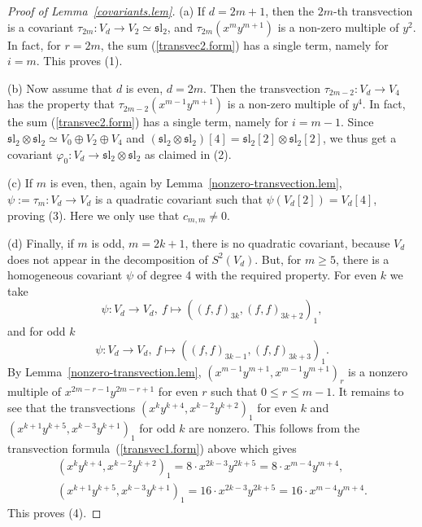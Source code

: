 \documentclass{amsart}
\theoremstyle{definition}
\theoremstyle{remark}
\begin{document}
\begin{proof}[Proof of Lemma~\ref{covariants.lem}]
(a) If $d = 2m+1$, then the $2m$-th transvection is a covariant $\tau_{2m}\colon V_{d} \to V_{2}\simeq \operatorname{{\mathfrak sl}_{2}}$, and  $\tau_{2m}(x^{m}y^{m+1})$ is a non-zero multiple of $y^{2}$. In fact, for $r=2m$, the sum (\ref{transvec2.form}) has a single term, namely for $i=m$. This proves (1).
\par\smallskip
(b) Now assume that $d$ is even, $d = 2m$. Then the transvection $\tau_{2m-2}\colon V_{d} \to V_{4}$ has the property that $\tau_{2m-2}(x^{m-1}y^{m+1})$ is a non-zero multiple of $y^{4}$. In fact, the sum (\ref{transvec2.form}) has a single term, namely for $i=m-1$. Since  $\operatorname{{\mathfrak sl}_{2}} \otimes \operatorname{{\mathfrak sl}_{2}} \simeq V_{0}\oplus V_{2}\oplus V_{4}$ and $(\operatorname{{\mathfrak sl}_{2}}\otimes\operatorname{{\mathfrak sl}_{2}})[4] = \operatorname{{\mathfrak sl}_{2}}[2]\otimes \operatorname{{\mathfrak sl}_{2}}[2]$, we thus get a covariant ${\varphi}_{0}\colon V_{d}\to \operatorname{{\mathfrak sl}_{2}}\otimes\operatorname{{\mathfrak sl}_{2}}$ as claimed in (2).
\par\smallskip
(c) If $m$ is even, then, again by Lemma~\ref{nonzero-transvection.lem}, $\psi:=\tau_{m}\colon V_{d} \to V_{d}$ is a quadratic covariant such that $\psi(V_{d}[2])=V_{d}[4]$, proving (3). Here we only use that $c_{m,m}\neq 0$.
\par\smallskip
(d) Finally, if $m$ is odd, $m=2k+1$, there is no quadratic covariant, because $V_{d}$ does not appear in the decomposition of $S^{2}(V_{d})$. But, for $m\geq 5$, there is a homogeneous covariant $\psi$ of degree 4 with the required property. For even $k$ we take 
$$
\psi\colon V_{d} \to V_{d}, \ f\mapsto ((f,f)_{3k},(f,f)_{3k+2})_{1},
$$
and for odd $k$
$$
\psi\colon V_{d} \to V_{d}, \ f\mapsto ((f,f)_{3k-1},(f,f)_{3k+3})_{1}.
$$
By Lemma~\ref{nonzero-transvection.lem}, $(x^{m-1}y^{m+1},x^{m-1}y^{m+1})_{r}$ is a nonzero multiple of $x^{2m-r-1}y^{2m-r+1}$ for even $r$ such that  $0\leq r\leq m-1$. It remains to see that the  transvections $(x^{k}y^{k+4},x^{k-2}y^{k+2})_{1}$ for even $k$ and $(x^{k+1}y^{k+5},x^{k-3}y^{k+1})_{1}$  for odd $k$ are nonzero.  This follows from the transvection formula~(\ref{transvec1.form}) above which gives
\begin{gather*}
(x^{k}y^{k+4},x^{k-2}y^{k+2})_{1}= 8\cdot x^{2k-3}y^{2k+5} = 8 \cdot x^{m-4}y^{m+4},\\
(x^{k+1}y^{k+5},x^{k-3}y^{k+1})_{1}= 16\cdot x^{2k-3}y^{2k+5} = 16 \cdot x^{m-4}y^{m+4}.
\end{gather*}
This proves (4).
\end{proof}
\end{document}

